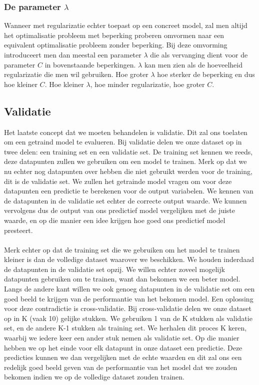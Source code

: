 \begin{abstract*}
\subsubsection{De parameter $\lambda$}
Wanneer met regularizatie echter toepast op een concreet model, zal men altijd het optimalisatie probleem met beperking proberen omvormen naar een equivalent optimalisatie probleem zonder beperking. Bij deze omvorming introduceert men dan meestal een parameter $\lambda$ die als vervanging dient voor de parameter $C$ in bovenstaande beperkingen. $\lambda$ kan men zien als de hoeveelheid regularizatie die men wil gebruiken. Hoe groter $\lambda$ hoe sterker de beperking en dus hoe kleiner $C$. Hoe kleiner $\lambda$, hoe minder regularizatie, hoe groter $C$.

\subsection{Validatie}
Het laatste concept dat we moeten behandelen is validatie. Dit zal ons toelaten om een getraind model te evalueren. Bij validatie delen we onze dataset op in twee delen: een training set en een validatie set. De training set kennen we reeds, deze datapunten zullen we gebruiken om een model te trainen. Merk op dat we nu echter nog datapunten over hebben die niet gebruikt werden voor de training, dit is de validatie set. We zullen het getrainde model vragen om voor deze datapunten een predictie te berekenen voor de output variabelen. We kennen van de datapunten in de validatie set echter de correcte output waarde. We kunnen vervolgens dus de output van ons predictief model vergelijken met de juiste waarde, en op die manier een idee krijgen hoe goed ons predictief model presteert. \\ \\
Merk echter op dat de training set die we gebruiken om het model te trainen kleiner is dan de volledige dataset waarover we beschikken. We houden inderdaad de datapunten in de validatie set opzij. We willen echter zoveel mogelijk datapunten gebruiken om te trainen, want dan bekomen we een beter model. Langs de andere kant willen we ook genoeg datapunten in de validatie set om een goed beeld te krijgen van de performantie van het bekomen model. Een oplossing voor deze contradictie is cross-validatie. Bij cross-validatie delen we onze dataset op in K (vaak 10) gelijke stukken. We gebruiken 1 van de K stukken als validatie set, en de andere K-1 stukken als training set. We herhalen dit proces K keren, waarbij we iedere keer een ander stuk nemen als validatie set. Op die manier hebben we op het einde voor elk datapunt in onze dataset een predictie. Deze predicties kunnen we dan vergelijken met de echte waarden en dit zal ons een redelijk goed beeld geven van de performantie van het model dat we zouden bekomen indien we op de volledige dataset zouden trainen.


\end{abstract*}
